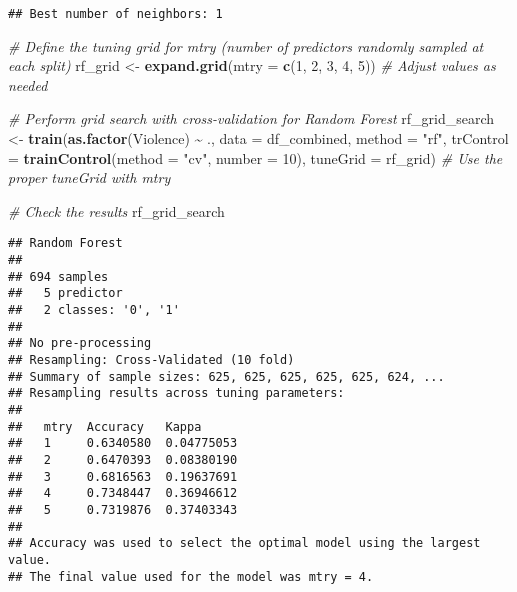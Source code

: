 \documentclass[
]{article}
\newenvironment{Shaded}{\begin{snugshade}}{\end{snugshade}}
\newcommand{\AttributeTok}[1]{\textcolor[rgb]{0.13,0.29,0.53}{#1}}
\newcommand{\CommentTok}[1]{\textcolor[rgb]{0.56,0.35,0.01}{\textit{#1}}}
\newcommand{\DecValTok}[1]{\textcolor[rgb]{0.00,0.00,0.81}{#1}}
\newcommand{\FunctionTok}[1]{\textcolor[rgb]{0.13,0.29,0.53}{\textbf{#1}}}
\newcommand{\NormalTok}[1]{#1}
\newcommand{\OtherTok}[1]{\textcolor[rgb]{0.56,0.35,0.01}{#1}}
\newcommand{\SpecialCharTok}[1]{\textcolor[rgb]{0.81,0.36,0.00}{\textbf{#1}}}
\newcommand{\StringTok}[1]{\textcolor[rgb]{0.31,0.60,0.02}{#1}}
\begin{document}
\begin{Shaded}
\end{Shaded}

\begin{verbatim}
## Best number of neighbors: 1
\end{verbatim}

\begin{Shaded}
\begin{Highlighting}[]
\CommentTok{\# Define the tuning grid for mtry (number of predictors randomly sampled at each split)}
\NormalTok{rf\_grid }\OtherTok{\textless{}{-}} \FunctionTok{expand.grid}\NormalTok{(}\AttributeTok{mtry =} \FunctionTok{c}\NormalTok{(}\DecValTok{1}\NormalTok{, }\DecValTok{2}\NormalTok{, }\DecValTok{3}\NormalTok{, }\DecValTok{4}\NormalTok{, }\DecValTok{5}\NormalTok{))  }\CommentTok{\# Adjust values as needed}

\CommentTok{\# Perform grid search with cross{-}validation for Random Forest}
\NormalTok{rf\_grid\_search }\OtherTok{\textless{}{-}} \FunctionTok{train}\NormalTok{(}\FunctionTok{as.factor}\NormalTok{(Violence) }\SpecialCharTok{\textasciitilde{}}\NormalTok{ ., }\AttributeTok{data =}\NormalTok{ df\_combined, }
                        \AttributeTok{method =} \StringTok{"rf"}\NormalTok{, }
                        \AttributeTok{trControl =} \FunctionTok{trainControl}\NormalTok{(}\AttributeTok{method =} \StringTok{"cv"}\NormalTok{, }\AttributeTok{number =} \DecValTok{10}\NormalTok{), }
                        \AttributeTok{tuneGrid =}\NormalTok{ rf\_grid)  }\CommentTok{\# Use the proper tuneGrid with mtry}

\CommentTok{\# Check the results}
\NormalTok{rf\_grid\_search}
\end{Highlighting}
\end{Shaded}

\begin{verbatim}
## Random Forest 
## 
## 694 samples
##   5 predictor
##   2 classes: '0', '1' 
## 
## No pre-processing
## Resampling: Cross-Validated (10 fold) 
## Summary of sample sizes: 625, 625, 625, 625, 625, 624, ... 
## Resampling results across tuning parameters:
## 
##   mtry  Accuracy   Kappa     
##   1     0.6340580  0.04775053
##   2     0.6470393  0.08380190
##   3     0.6816563  0.19637691
##   4     0.7348447  0.36946612
##   5     0.7319876  0.37403343
## 
## Accuracy was used to select the optimal model using the largest value.
## The final value used for the model was mtry = 4.
\end{verbatim}
\end{document}
